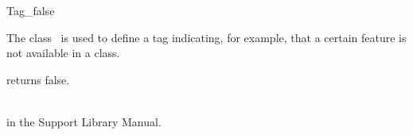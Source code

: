 \begin{ccRefClass}{Tag_false}

\ccDefinition

The class \ccRefName\ is used to define a tag indicating, for example,
that a certain feature is not available in a class.


{returns false.}

\ccSeeAlso
{} \\
 in the Support Library Manual.

\end{ccRefClass}

